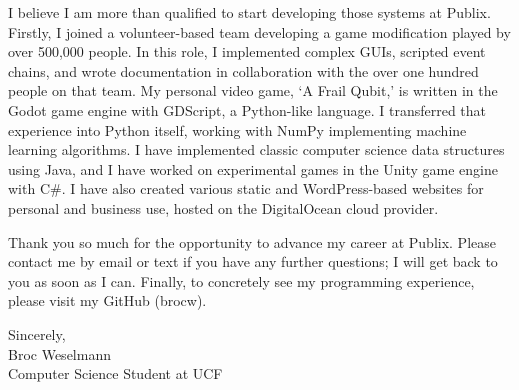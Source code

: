 \documentclass[12pt]{letter}
\begin{document}
I believe I am more than qualified to start developing those systems at Publix. Firstly, I joined a volunteer-based team developing a game modification played by over 500,000 people. In this role, I implemented complex GUIs, scripted event chains, and wrote documentation in collaboration with the over one hundred people on that team. My personal video game, `A Frail Qubit,' is written in the Godot game engine with GDScript, a Python-like language. I transferred that experience into Python itself, working with NumPy implementing machine learning algorithms. I have implemented classic computer science data structures using Java, and I have worked on experimental games in the Unity game engine with C\#. I have also created various static and WordPress-based websites for personal and business use, hosted on the DigitalOcean cloud provider.

Thank you so much for the opportunity to advance my career at Publix. Please contact me by email or text if you have any further questions; I will get back to you as soon as I can. Finally, to concretely see my programming experience, please visit my GitHub (brocw). 

\vspace{0.4in}

Sincerely, \\
Broc Weselmann \\
Computer Science Student at UCF
\end{document}

